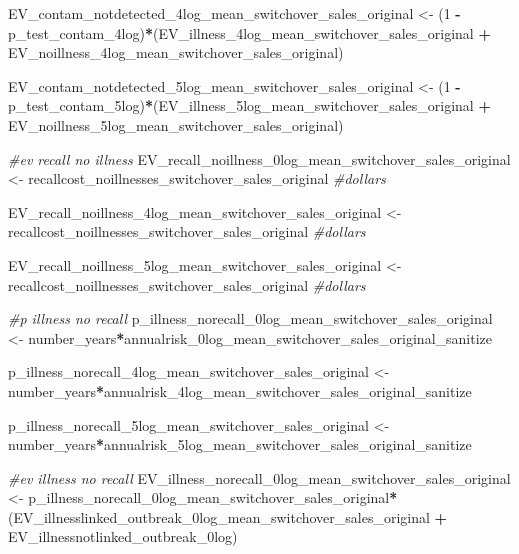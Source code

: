 \documentclass[
]{article}
\newenvironment{Shaded}{\begin{snugshade}}{\end{snugshade}}
\newcommand{\CommentTok}[1]{\textcolor[rgb]{0.56,0.35,0.01}{\textit{#1}}}
\newcommand{\DecValTok}[1]{\textcolor[rgb]{0.00,0.00,0.81}{#1}}
\newcommand{\NormalTok}[1]{#1}
\newcommand{\OtherTok}[1]{\textcolor[rgb]{0.56,0.35,0.01}{#1}}
\newcommand{\SpecialCharTok}[1]{\textcolor[rgb]{0.81,0.36,0.00}{\textbf{#1}}}
\begin{document}
\begin{Shaded}
\begin{Highlighting}[]
\NormalTok{EV\_contam\_notdetected\_4log\_mean\_switchover\_sales\_original }\OtherTok{\textless{}{-}}\NormalTok{ (}\DecValTok{1} \SpecialCharTok{{-}}\NormalTok{ p\_test\_contam\_4log)}\SpecialCharTok{*}\NormalTok{(EV\_illness\_4log\_mean\_switchover\_sales\_original }\SpecialCharTok{+}\NormalTok{ EV\_noillness\_4log\_mean\_switchover\_sales\_original)}

\NormalTok{EV\_contam\_notdetected\_5log\_mean\_switchover\_sales\_original }\OtherTok{\textless{}{-}}\NormalTok{ (}\DecValTok{1} \SpecialCharTok{{-}}\NormalTok{ p\_test\_contam\_5log)}\SpecialCharTok{*}\NormalTok{(EV\_illness\_5log\_mean\_switchover\_sales\_original }\SpecialCharTok{+}\NormalTok{ EV\_noillness\_5log\_mean\_switchover\_sales\_original)}


\CommentTok{\#ev recall no illness}
\NormalTok{EV\_recall\_noillness\_0log\_mean\_switchover\_sales\_original }\OtherTok{\textless{}{-}}\NormalTok{ recallcost\_noillnesses\_switchover\_sales\_original }\CommentTok{\#dollars}

\NormalTok{EV\_recall\_noillness\_4log\_mean\_switchover\_sales\_original }\OtherTok{\textless{}{-}}\NormalTok{ recallcost\_noillnesses\_switchover\_sales\_original }\CommentTok{\#dollars}

\NormalTok{EV\_recall\_noillness\_5log\_mean\_switchover\_sales\_original }\OtherTok{\textless{}{-}}\NormalTok{ recallcost\_noillnesses\_switchover\_sales\_original }\CommentTok{\#dollars}


\CommentTok{\#p illness no recall}
\NormalTok{p\_illness\_norecall\_0log\_mean\_switchover\_sales\_original }\OtherTok{\textless{}{-}}\NormalTok{ number\_years}\SpecialCharTok{*}\NormalTok{annualrisk\_0log\_mean\_switchover\_sales\_original\_sanitize }


\NormalTok{p\_illness\_norecall\_4log\_mean\_switchover\_sales\_original }\OtherTok{\textless{}{-}}\NormalTok{ number\_years}\SpecialCharTok{*}\NormalTok{annualrisk\_4log\_mean\_switchover\_sales\_original\_sanitize }

\NormalTok{p\_illness\_norecall\_5log\_mean\_switchover\_sales\_original }\OtherTok{\textless{}{-}}\NormalTok{ number\_years}\SpecialCharTok{*}\NormalTok{annualrisk\_5log\_mean\_switchover\_sales\_original\_sanitize}



\CommentTok{\#ev illness no recall}
\NormalTok{EV\_illness\_norecall\_0log\_mean\_switchover\_sales\_original }\OtherTok{\textless{}{-}}\NormalTok{ p\_illness\_norecall\_0log\_mean\_switchover\_sales\_original}\SpecialCharTok{*}\NormalTok{(EV\_illnesslinked\_outbreak\_0log\_mean\_switchover\_sales\_original }\SpecialCharTok{+}\NormalTok{ EV\_illnessnotlinked\_outbreak\_0log)}


\end{Highlighting}
\end{Shaded}
\end{document}
